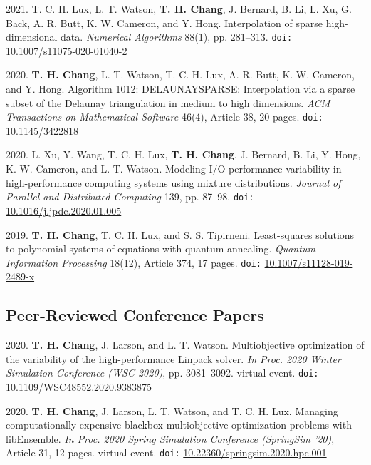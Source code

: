 \documentclass[10pt]{article}
\begin{document}
\medskip

2021. T. C. H. Lux, L. T. Watson, {\bf T. H. Chang}, J. Bernard, B. Li, L. Xu, G. Back, A. R. Butt, K. W. Cameron, and Y. Hong. Interpolation of sparse high-dimensional data. {\sl Numerical Algorithms} 88(1), pp. 281--313. {\tt doi:} \href{https://doi.org/10.1007/s11075-020-01040-2}{10.1007/s11075-020-01040-2}

\medskip

2020. {\bf T. H. Chang}, L. T. Watson, T. C. H. Lux, A. R. Butt, K. W. Cameron, and Y. Hong. Algorithm 1012: DELAUNAYSPARSE: Interpolation via a sparse subset of the Delaunay triangulation in medium to high dimensions. {\sl ACM Transactions on Mathematical Software} 46(4), Article 38, 20 pages. {\tt doi:} \href{https://doi.org/10.1145/3422818}{10.1145/3422818}

\medskip

2020. L. Xu, Y. Wang, T. C. H. Lux, {\bf T. H. Chang}, J. Bernard, B. Li, Y. Hong, K. W. Cameron, and L. T. Watson. Modeling I/O performance variability in high-performance computing systems using mixture distributions. {\sl Journal of Parallel and Distributed Computing} 139, pp. 87--98. {\tt doi:} \href{https://doi.org/10.1016/j.jpdc.2020.01.005}{10.1016/j.jpdc.2020.01.005}

\medskip

2019. {\bf T. H. Chang}, T. C. H. Lux, and S. S. Tipirneni. Least-squares solutions to polynomial systems of equations with quantum annealing. {\sl Quantum Information Processing} 18(12), Article 374, 17 pages. {\tt doi:} \href{https://doi.org/10.1007/s11128-019-2489-x}{10.1007/s11128-019-2489-x}
\subsection*{Peer-Reviewed Conference Papers}
2020. {\bf T. H. Chang}, J. Larson, and L. T. Watson. Multiobjective optimization of the variability of the high-performance Linpack solver. {\sl In Proc. 2020 Winter Simulation Conference (WSC 2020)}, pp. 3081--3092. virtual event. {\tt doi:} \href{https://doi.org/10.1109/WSC48552.2020.9383875}{10.1109/WSC48552.2020.9383875}

\medskip

2020. {\bf T. H. Chang}, J. Larson, L. T. Watson, and T. C. H. Lux. Managing computationally expensive blackbox multiobjective optimization problems with libEnsemble. {\sl In Proc. 2020 Spring Simulation Conference (SpringSim '20)}, Article 31, 12 pages. virtual event. {\tt doi:} \href{https://doi.org/10.22360/springsim.2020.hpc.001}{10.22360/springsim.2020.hpc.001}
\end{document}
